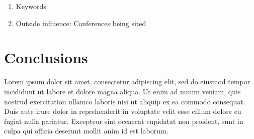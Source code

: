 \documentclass[journal,twocolumn]{IEEEtran}
\providecommand{\tightlist}{%
      \setlength{\itemsep}{0pt}\setlength{\parskip}{0pt}}
\begin{document}
\begin{enumerate}
\def\labelenumi{\arabic{enumi}.}
\tightlist
\item
  Keywords
\item
  Outside influence: Conferences being sited
\end{enumerate}

    \hypertarget{conclusions}{%
\section{Conclusions}\label{conclusions}}

Lorem ipsum dolor sit amet, consectetur adipiscing elit, sed do eiusmod
tempor incididunt ut labore et dolore magna aliqua. Ut enim ad minim
veniam, quis nostrud exercitation ullamco laboris nisi ut aliquip ex ea
commodo consequat. Duis aute irure dolor in reprehenderit in voluptate
velit esse cillum dolore eu fugiat nulla pariatur. Excepteur sint
occaecat cupidatat non proident, sunt in culpa qui officia deserunt
mollit anim id est laborum.
\newpage

    
    



    
    
\end{document}
